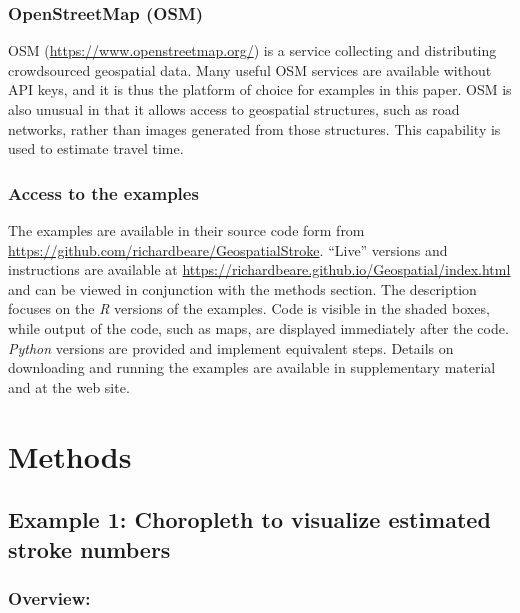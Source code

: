 \documentclass[utf8]{frontiersHLTH}
\begin{document}
\subsubsection{OpenStreetMap (OSM)}\label{openstreetmap-osm}

OSM (\url{https://www.openstreetmap.org/}) is a service collecting and
distributing crowdsourced geospatial data. Many useful OSM services are
available without API keys, and it is thus the platform of choice for
examples in this paper. OSM is also unusual in that it allows access to
geospatial structures, such as road networks, rather than images
generated from those structures. This capability is used to estimate
travel time.

\subsubsection{Access to the examples}\label{access-to-the-examples}

The examples are available in their source code form from
\href{https://github.com/richardbeare/GeospatialStroke}{https://github.com/richardbeare/GeospatialStroke}.
``Live'' versions and instructions are available at
\href{https://richardbeare.github.io/Geospatial/index.html}{https://richardbeare.github.io/Geospatial/index.html}
and can be viewed in conjunction with the methods section. The
description focuses on the {\em R} versions of the examples. Code is visible
in the shaded boxes, while output of the code, such as maps, are
displayed immediately after the code. {\em Python} versions are provided and
implement equivalent steps.  Details on downloading and running the
examples are available in supplementary material and at the web site.

\section{Methods}\label{methods}

\subsection{Example 1: Choropleth to visualize estimated stroke
numbers}\label{example-1-choropleth-to-visualize-estimated-stroke-numbers}

\subsubsection{Overview:}\label{overview}
\end{document}
